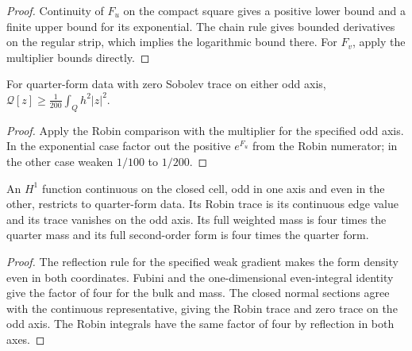 \begin{proof}
\leanok
Continuity of $F_u$ on the compact square gives a positive lower bound
and a finite upper bound for its exponential. The chain rule gives
bounded derivatives on the regular strip, which implies the logarithmic
bound there. For $F_v$, apply the multiplier bounds directly.
\end{proof}

\begin{lemma}
\label{lem:mixed-quarter-coercivity}
\leanok
For quarter-form data with zero Sobolev trace on either odd axis,
$\mathcal Q[z]\ge \frac1{200}\int_Q h^2|z|^2$.
\end{lemma}

\begin{proof}
\leanok
Apply the Robin comparison with the multiplier for the specified odd axis.
In the exponential case factor out the positive $e^{F_u}$ from the
Robin numerator; in the other case weaken $1/100$ to $1/200$.
\end{proof}

\begin{lemma}
\label{lem:mixed-fold-quarter}
\leanok
An $H^1$ function continuous on the closed cell, odd in one axis and even
in the other, restricts to quarter-form data. Its Robin trace is its
continuous edge value and its trace vanishes on the odd axis. Its full
weighted mass is four times the quarter mass and its full second-order
form is four times the quarter form.
\end{lemma}

\begin{proof}
\leanok
The reflection rule for the specified weak gradient makes the form
density even in both coordinates. Fubini and the one-dimensional
even-integral identity give the factor of four for the bulk and mass.
The closed normal sections agree with the continuous representative,
giving the Robin trace and zero trace on the odd axis. The Robin
integrals have the same factor of four by reflection in both axes.
\end{proof}

